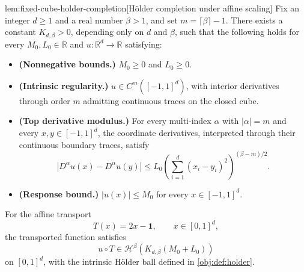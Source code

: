 \documentclass[11pt]{article}
\begin{document}
\begin{lemmav}{lem:fixed-cube-holder-completion}[Hölder completion under affine scaling]
Fix an integer \(d\ge 1\) and a real number \(\beta>1\), and set \(m=\lceil\beta\rceil-1\). There exists a constant \(K_{d,\beta}>0\), depending only on \(d\) and \(\beta\), such that the following holds for every \(M_0,L_0\in\mathbb R\) and \(u:\mathbb R^d\to\mathbb R\) satisfying:
\begin{itemize}
\item \textbf{(Nonnegative bounds.)} \(M_0\ge0\) and \(L_0\ge0\).
\item \textbf{(Intrinsic regularity.)} \(u\in C^m([-1,1]^d)\), with interior derivatives through order \(m\) admitting continuous traces on the closed cube.
\item \textbf{(Top derivative modulus.)} For every multi-index \(\alpha\) with \(|\alpha|=m\) and every \(x,y\in[-1,1]^d\), the coordinate derivatives, interpreted through their continuous boundary traces, satisfy
\[
|D^\alpha u(x)-D^\alpha u(y)|
\le L_0\left(\sum_{i=1}^d(x_i-y_i)^2\right)^{(\beta-m)/2}.
\]
\item \textbf{(Response bound.)} \(|u(x)|\le M_0\) for every \(x\in[-1,1]^d\).
\end{itemize}
For the affine transport
\[
T(x)=2x-\mathbf1,\qquad x\in[0,1]^d,
\]
the transported function satisfies
\[
u\circ T\in\mathcal H^\beta\!\left(K_{d,\beta}(M_0+L_0)\right)
\]
on \([0,1]^d\), with the intrinsic Hölder ball defined in \cref{obj:def:holder}.
\end{lemmav}
\end{document}
